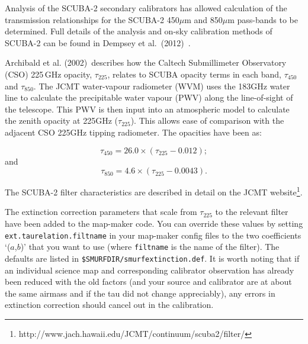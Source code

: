 \documentclass[twoside,11pt]{article}
\newcommand{\htmladdnormallinkfoot}[2]{#1\footnote{#2}}
\renewcommand{\_}{\texttt{\symbol{95}}}
\newcommand{\param}[1]{\texttt{#1}}
\begin{document}
Analysis of the SCUBA-2 secondary calibrators has allowed calculation
of the transmission relationships for the SCUBA-2 450$\mu$m and
850$\mu$m pass-bands to be determined. Full details of the analysis
and on-sky calibration methods of SCUBA-2 can be found in Dempsey et
al.\ (2012)~\cite{dempsey12}\cite{dempsey-spie}.

Archibald et al. (2002)\,\cite{archibald} describes how the Caltech
Submillimeter Observatory (CSO) 225\,GHz opacity, $\tau_{225}$,
relates to SCUBA opacity terms in each band, $\tau_{450}$ and
$\tau_{850}$. The JCMT water-vapour radiometer (WVM) uses the 183GHz
water line to calculate the precipitable water vapour (PWV) along the
line-of-sight of the telescope. This PWV is then input into an
atmospheric model to calculate the zenith opacity at 225GHz
($\tau_{225}$). This allows ease of comparison with the adjacent CSO
225GHz tipping radiometer. The opacities have been as:

\begin{equation}
\tau_{450} = 26.0 \times (\tau_{225} - 0.012);
\end{equation}
and
\begin{equation}
\tau_{850} = 4.6 \times (\tau_{225} - 0.0043).
\end{equation}

The SCUBA-2 filter characteristics are described in
detail \htmladdnormallinkfoot{on the JCMT
website}{http://www.jach.hawaii.edu/JCMT/continuum/scuba2/filter/}.

The extinction correction parameters that scale from $\tau_{225}$ to
the relevant filter have been added to the map-maker code. You can
override these values by setting \param{ext.taurelation.filtname} in
your map-maker config files to the two coefficients `($a$,$b$)' that you
want to use (where \texttt{filtname} is the name of the filter). The
defaults are listed in \texttt{\$SMURF\_DIR/smurf\_extinction.def}.
It is worth noting that if an
individual science map and corresponding calibrator observation has
already been reduced with the old factors (and your source and
calibrator are at about the same airmass and if the tau did not change
appreciably), any errors in extinction correction should cancel out in
the calibration.

\clearpage
\end{document}

